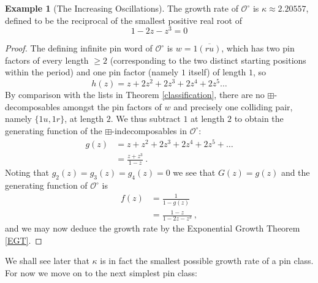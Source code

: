 \documentclass[11pt,a4paper]{article}
\theoremstyle{definition}
\newtheorem{example}[thm]{Example}
\begin{document}
\begin{example}[The Increasing Oscillations] \label{ex:defO}
The growth rate of $\mathcal{O}^{\circ}$ is $\kappa \approx 2.20557$, defined to be the reciprocal of the smallest positive real root of
\[
1 - 2z - z^3 = 0
\]
\end{example}

\begin{proof}
The defining infinite pin word of $\mathcal{O}^{\circ}$ is $w=1\overline{(ru)}$, which has two pin factors of every length $\geq 2$ (corresponding to the two distinct starting positions within the period) and one pin factor (namely $1$ itself) of length $1$, so
\[
h(z) = z + 2z^2 + 2z^3 + 2z^4 + 2z^5 \dots
\]
By comparison with the lists in Theorem \ref{classification}, there are no $\boxplus$-decomposables amongst the pin factors of $w$ and precisely one colliding pair, namely $\{1u,1r\}$, at length $2$. We thus subtract $1$ at length $2$ to obtain the generating function of the $\boxplus$-indecomposables in $\mathcal{O}^{\circ}$:
\[
\begin{split}
g(z) & = z + z^2 + 2z^3 + 2z^4 + 2z^5 + \dots \\
 & = \frac{z+z^3}{1-z} \ .
\end{split}
\]
Noting that $g_{2}(z) = g_{3}(z) = g_{4}(z) = 0$ we see that $G(z)=g(z)$ and the generating function of $\mathcal{O}^{\circ}$ is
\[
\begin{split}
f(z) & = \frac{1}{1 - g(z)} \\
 & = \frac{1-z}{1 - 2z - z^3} \ ,
\end{split}
\]
and we may now deduce the growth rate by the Exponential Growth Theorem \ref{EGT}. \end{proof}

We shall see later that $\kappa$ is in fact the smallest possible growth rate of a pin class. For now we move on to the next simplest pin class:
\end{document}
